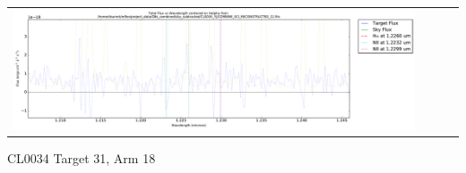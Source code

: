 \documentclass[10pt,letterpaper]{article}
\begin{document}
\begin{table}[h!]
\begin{center}
\begin{tabular}{ >{\centering\arraybackslash}m{2.5in} >{\centering\arraybackslash}m{2.5in} >{\centering\arraybackslash}m{2.5in} >{\centering\arraybackslash}m{2.3in}}
\includegraphics[scale=0.45]{../figures/CL0034_YJ/COMBINE_SCI_RECONSTRUCTED_12_Halpha.pdf}
\end{tabular}
\end{center}
\end{table}

\newpage 

CL0034 Target 31, Arm 18 \\
\end{document}
